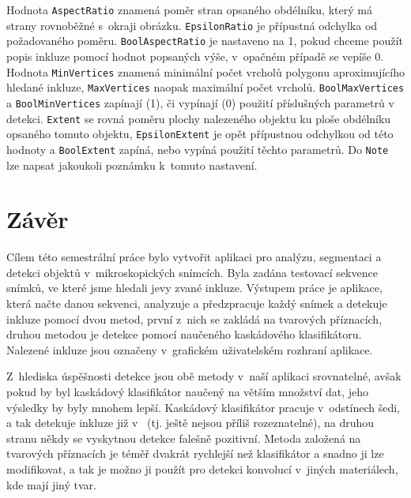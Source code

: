 \documentclass[12pt, a4paper]{report}
\begin{document}
	Hodnota \texttt{AspectRatio} znamená poměr stran opsaného obdélníku, který má strany rovnoběžné s~okraji obrázku. \texttt{EpsilonRatio} je přípustná odchylka od požadovaného poměru. \texttt{BoolAspectRatio} je nastaveno na 1, pokud chceme použít popis inkluze pomocí hodnot popsaných výše, v~opačném případě se vepíše 0. Hodnota \texttt{MinVertices} znamená minimální počet vrcholů polygonu aproximujícího hledané inkluze, \texttt{MaxVertices} naopak maximální počet vrcholů. \texttt{BoolMaxVertices} a \texttt{BoolMinVertices} zapínají (1), či vypínají (0) použití příslušných parametrů v detekci. \texttt{Extent} se rovná poměru plochy nalezeného objektu ku ploše obdélníku opsaného tomuto objektu, \texttt{EpsilonExtent} je opět přípustnou odchylkou od této hodnoty a \texttt{BoolExtent} zapíná, nebo vypíná použití těchto parametrů. Do \texttt{Note} lze napsat jakoukoli poznámku k~tomuto nastavení.

\chapter{Závěr}
Cílem této semestrální práce bylo vytvořit aplikaci pro analýzu, segmentaci a detekci objektů v~mikroskopických snímcích. Byla zadána testovací sekvence snímků, ve které jsme hledali jevy zvané inkluze. Výstupem práce je aplikace, která načte danou sekvenci, analyzuje a předzpracuje každý snímek a detekuje inkluze pomocí dvou metod, první z~nich se zakládá na tvarových příznacích, druhou metodou je detekce pomocí naučeného kaskádového klasifikátoru. Nalezené inkluze jsou označeny v~grafickém uživatelském rozhraní aplikace.

Z~hlediska úspěšnosti detekce jsou obě metody v~naší aplikaci srovnatelné, avšak pokud by byl kaskádový klasifikátor naučený na větším množství dat, jeho výsledky by byly mnohem lepší. Kaskádový klasifikátor pracuje v~odstínech šedi, a tak detekuje inkluze již v~ (tj. ještě nejsou příliš rozeznatelné), na druhou stranu někdy se vyskytnou detekce falešně pozitivní. Metoda založená na tvarových příznacích je téměř dvakrát rychlejší než klasifikátor a snadno ji lze modifikovat, a tak je možno ji použít pro detekci konvolucí v~jiných materiálech, kde mají jiný tvar.
\end{document}
